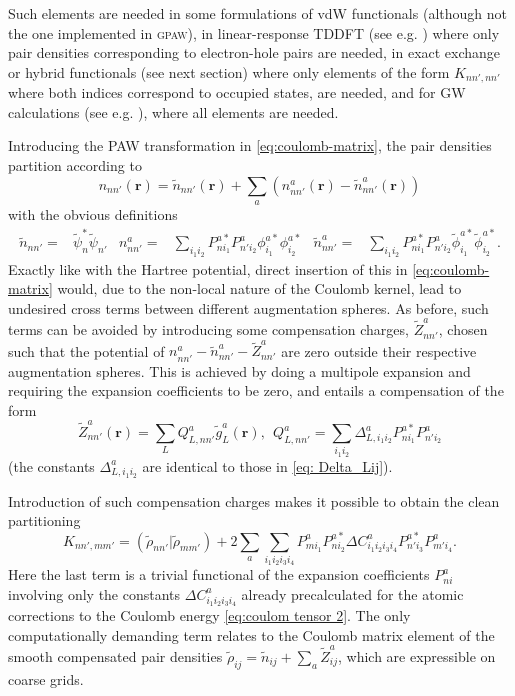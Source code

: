\documentclass[a4paper]{article}
\newcommand{\gpaw}{\textsc{gpaw}}
\newcommand{\s}[1]{\tilde{#1}}
\newcommand{\br}{\mathbf{r}}
\begin{document}
Such elements are needed in some formulations of vdW functionals
(although not the one implemented in \gpaw), in linear-response TDDFT
(see e.g. \cite{Walter2008}) where only pair densities corresponding
to electron-hole pairs are needed, in exact exchange or hybrid
functionals (see next section) where only elements of the form
$K_{nn',nn'}$ where both indices correspond to occupied states, are
needed, and for GW calculations (see e.g.  \cite{Rostgaard2010}),
where all elements are needed.

Introducing the PAW transformation in \ref{eq:coulomb-matrix}, the
pair densities partition according to
\begin{equation}
  \label{eq:pair density}
  n_{nn'}(\br) = \s{n}_{nn'}(\br) + \sum_a \left( n^a_{nn'}(\br) - \s{n}^a_{nn'}(\br) \right)
\end{equation}
with the obvious definitions
\begin{align}
  \s{n}_{nn'} =& \s{\psi}_n^*\s{\psi}_{n'} & n^a_{nn'} = & \sum_{i_1i_2} P^{a*}_{ni_1} P^{a}_{n'i_2} \phi^{a*}_{i_1} \phi^{a*}_{i_2} & \s{n}^a_{nn'} = & \sum_{i_1i_2} P^{a*}_{ni_1} P^{a}_{n'i_2} \s{\phi}^{a*}_{i_1} \s{\phi}^{a*}_{i_2}.
\end{align}
Exactly like with the Hartree potential, direct insertion of this in
\ref{eq:coulomb-matrix} would, due to the non-local nature of the
Coulomb kernel, lead to undesired cross terms between different
augmentation spheres. As before, such terms can be avoided by
introducing some compensation charges, $\s{Z}^a_{nn'}$, chosen such that the
potential of $n^a_{nn'} - \s{n}^a_{nn'} - \s{Z}^a_{nn'}$ are zero
outside their respective augmentation spheres. This is achieved by
doing a multipole expansion and requiring the expansion coefficients
to be zero, and entails a compensation of the form
\begin{equation}
  \label{eq:pair compensation}
  \s{Z}^a_{nn'}(\br) = \sum_L Q^a_{L,nn'} \s{g}^a_L(\br), ~~ Q^a_{L,nn'} = \sum_{i_1i_2} \Delta^a_{L,i_1i_2} P^{a*}_{ni_1} P^{a}_{n'i_2}
\end{equation}
(the constants $\Delta^a_{L,i_1i_2}$ are identical to those in
\ref{eq: Delta_Lij}).

Introduction of such compensation charges makes it possible to
obtain the clean partitioning
\begin{equation}
  \label{eq:coulomb-matrix-partition}
  K_{nn',mm'} = (\tilde{\rho}_{nn'} | \tilde{\rho}_{mm'}) + 2\sum_a \sum_{i_1i_2i_3i_4} P^{a}_{mi_1} P^{a*}_{ni_2} \Delta C^a_{i_1i_2i_3i_4} P^{a*}_{n'i_3} P^{a}_{m'i_4}.
\end{equation}
Here the last term is a trivial functional of the expansion
coefficients $P^a_{ni}$ involving only the constants $\Delta
C^a_{i_1i_2i_3i_4}$ already precalculated for the atomic corrections
to the Coulomb energy \ref{eq:coulom tensor 2}. The only
computationally demanding term relates to the Coulomb matrix element
of the smooth compensated pair densities $\tilde{\rho}_{ij} =
\tilde{n}_{ij} + \sum_a \tilde{Z}^a_{ij}$, which are expressible on
coarse grids.
\end{document}
